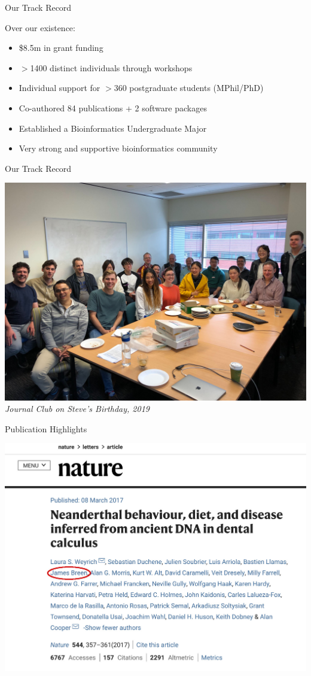\documentclass[11pt]{beamer}
\begin{document}
\begin{frame}{Our Track Record}

Over our existence:

	\begin{itemize}
		\item \$8.5m in grant funding
		\item $>$1400 distinct individuals through workshops
		\item Individual support for $>$360 postgraduate students (MPhil/PhD)
		\item Co-authored 84 publications + 2 software packages
		\item Established a Bioinformatics Undergraduate Major
		\item Very strong and supportive bioinformatics community\\[5mm]
	\end{itemize}

\end{frame}

\begin{frame}{Our Track Record}

\small
\center
\includegraphics[width=0.75\linewidth]{figures/HubMeetingRoom.jpg}\\
\textit{Journal Club on Steve's Birthday, 2019}\\[1cm]

\end{frame}

\begin{frame}{Publication Highlights}

\center
\includegraphics[width=0.7\linewidth]{figures/Nature.jpg} \\[1cm]

\end{frame}
\end{document}
